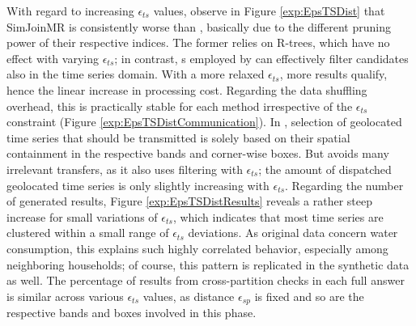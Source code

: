 With regard to increasing $\epsilon_{ts}$ values, observe in Figure \ref{exp:EpsTSDist} that SimJoinMR is consistently worse than \opt, basically due to the different pruning power of their respective indices. The former relies on R-trees, which have no effect with varying $\epsilon_{ts}$; in contrast, {\btsr}s employed by \opt can effectively filter candidates also in the time series domain. With a more relaxed $\epsilon_{ts}$, more results qualify, hence the linear increase in processing cost. Regarding the data shuffling overhead, this is practically stable for each method irrespective of the $\epsilon_{ts}$ constraint (Figure \ref{exp:EpsTSDistCommunication}). In \base, selection of geolocated time series that should be transmitted is solely based on their spatial containment in the respective bands and corner-wise boxes. But \opt avoids many irrelevant transfers, as it also uses filtering with $\epsilon_{ts}$; the amount of dispatched geolocated time series is only slightly increasing with $\epsilon_{ts}$. Regarding the number of generated results, Figure \ref{exp:EpsTSDistResults} reveals a rather steep increase for small variations of $\epsilon_{ts}$, which indicates that most time series are clustered within a small range of $\epsilon_{ts}$ deviations. As original data concern water consumption, this explains such highly correlated behavior, especially among neighboring households; of course, this pattern is replicated in the synthetic data as well. The percentage of results from cross-partition checks in each full answer is similar across various $\epsilon_{ts}$ values, as distance $\epsilon_{sp}$ is fixed and so are the respective bands and boxes involved in this phase.


